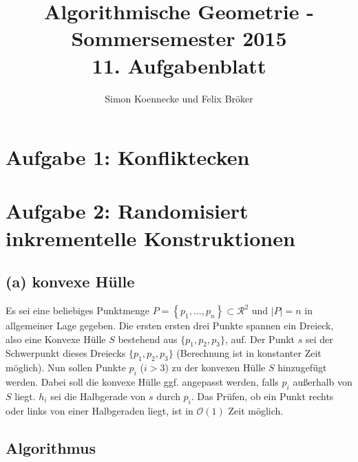 \documentclass[a4paper]{article}
\begin{document}
\title{Algorithmische Geometrie - Sommersemester 2015\\
       11. Aufgabenblatt }
\author{Simon Koennecke und Felix Bröker}
\date{}
\maketitle

\section*{Aufgabe 1: Konfliktecken}



\section*{Aufgabe 2: Randomisiert inkrementelle Konstruktionen}



\subsection*{(a) konvexe Hülle}

Es sei eine beliebiges Punktmenge $P = \left\{p_1, \dots, p_n\right\} \subset \mathcal{R}^2$ und $|P| = n$ in allgemeiner Lage gegeben. 
Die ersten ersten drei Punkte spannen ein Dreieck, also eine Konvexe Hülle $S$ bestehend aus $\{p_1, p_2, p_3\}$, auf. 
Der Punkt $s$ sei der Schwerpunkt dieses Dreiecks $\{p_1, p_2, p_3\}$ (Berechnung ist in konstanter Zeit möglich).
Nun sollen Punkte $p_i$ ($i > 3$) zu der konvexen Hülle $S$ hinzugefügt werden. 
Dabei soll die konvexe Hülle ggf. angepasst werden, falls $p_i$ außerhalb von $S$ liegt. 
$h_i$ sei die Halbgerade von $s$ durch $p_i$. Das Prüfen, ob ein Punkt rechts oder links von einer Halbgeraden liegt, ist in $\mathcal{O}(1)$ Zeit möglich.

\subsection*{Algorithmus}
\end{document}
